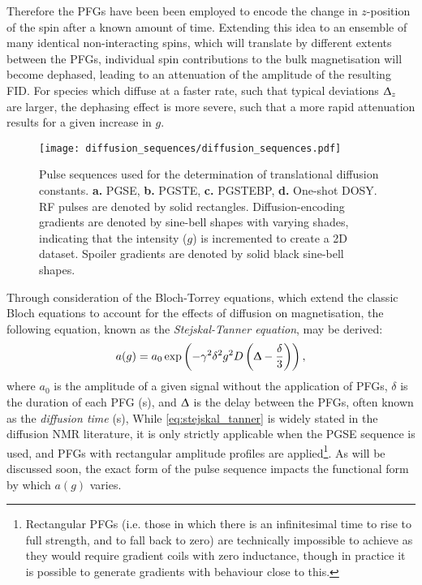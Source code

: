 Therefore the \acp{PFG} have been been employed to encode the
change in $z$-position of the spin after a known amount of time.
Extending this idea to an ensemble of many identical non-interacting spins,
which will translate by different extents between the \acp{PFG}, individual
spin contributions to the bulk magnetisation will become dephased, leading to
an attenuation of the amplitude of the resulting \ac{FID}. For species which
diffuse at a faster rate, such that typical deviations $\Updelta_z$ are
larger, the dephasing effect is more severe, such that a more rapid attenuation
results for a given increase in $g$.

\begin{figure}
   \texttt{[image: diffusion\_sequences/diffusion\_sequences.pdf]}
   \caption[
       Pulse sequences used for the determination of translational diffusion constants.
   ]{
       Pulse sequences used for the determination of translational diffusion constants.
       \textbf{a.} \acs{PGSE},
       \textbf{b.} \acs{PGSTE},
       \textbf{c.} \acs{PGSTEBP},
       \textbf{d.} One-shot DOSY.
       \ac{RF} pulses are denoted by solid rectangles. Diffusion-encoding
       gradients are denoted by sine-bell shapes with varying shades,
       indicating that the intensity ($g$) is incremented to create a \ac{2D}
       dataset. Spoiler gradients are denoted by solid black sine-bell shapes.
   }
   \label{fig:diffusion_sequences}
\end{figure}

Through consideration of the Bloch-Torrey equations, which
extend the classic Bloch equations to account for the effects of diffusion on
magnetisation\cite{Torrey1956}, the following equation, known as the
\emph{Stejskal-Tanner equation}, may be derived:
\begin{equation}
    a(g) = a_0 \exp \left(- \gamma^2 \delta^2 g^2 D \left(\Updelta -
    \frac{\delta}{3}\right)\right),
    \label{eq:stejskal_tanner}
\end{equation}
where
$a_0$ is the amplitude of a given signal without the application of \acp{PFG},
$\delta$ is the duration of each \ac{PFG} (\unit{\second}), and
$\Updelta$ is the delay between the \acp{PFG}, often known as the \emph{diffusion time}
(\unit{\second}),
While \cref{eq:stejskal_tanner} is widely stated in the diffusion \ac{NMR}
literature, it is only strictly applicable when the \ac{PGSE} sequence is used,
and \acp{PFG} with rectangular amplitude profiles are applied\footnote{
    Rectangular \acp{PFG} (i.e. those in which there is an infinitesimal time
    to rise to full strength, and to fall back to zero) are technically
    impossible to achieve as they would require gradient coils with zero
    inductance, though in practice it is possible to generate gradients with
    behaviour close to this.
}. As will be discussed soon, the exact form of the pulse sequence impacts the
functional form by which $a(g)$ varies.

